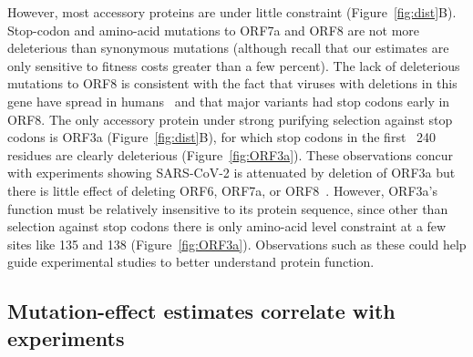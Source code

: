 \documentclass[9pt,twocolumn,twoside]{gsajnl_modified}
\begin{document}
However, most accessory proteins are under little constraint (Figure~\ref{fig:dist}B).
Stop-codon and amino-acid mutations to ORF7a and ORF8 are not more deleterious than synonymous mutations (although recall that our estimates are only sensitive to fitness costs greater than a few percent).
The lack of deleterious mutations to ORF8 is consistent with the fact that viruses with deletions in this gene have spread in humans~\citep{su2020discovery} and that major variants had stop codons early in ORF8.
The only accessory protein under strong purifying selection against stop codons is ORF3a (Figure~\ref{fig:dist}B), for which stop codons in the first ~240 residues are clearly deleterious (Figure~\ref{fig:ORF3a}).
These observations concur with experiments showing SARS-CoV-2 is attenuated by deletion of ORF3a but there is little effect of deleting ORF6, ORF7a, or ORF8~\citep{mcgrath2022sars,silvas2021contribution,liu2022live}.
However, ORF3a's function must be relatively insensitive to its protein sequence, since other than selection against stop codons there is only amino-acid level constraint at a few sites like 135 and 138 (Figure~\ref{fig:ORF3a}).
Observations such as these could help guide experimental studies to better understand protein function.

\subsection*{Mutation-effect estimates correlate with experiments}
\end{document}
